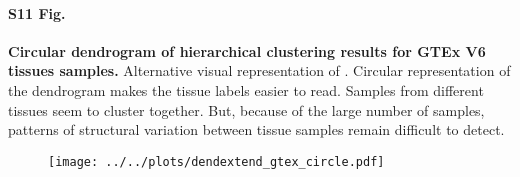 \documentclass[10pt,letterpaper]{article}
\begin{document}
\paragraph*{S11 Fig.}

\label{figS11}
{\bf Circular dendrogram of hierarchical clustering results for GTEx V6 tissues samples.} Alternative visual representation of . Circular representation of the dendrogram makes the tissue labels easier to read. Samples from different tissues seem to cluster together. But, because of the large number of samples, patterns of structural variation between tissue samples remain difficult to detect.
\begin{figure}[ht]
\centering
\texttt{[image: ../../plots/dendextend\_gtex\_circle.pdf]}
\end{figure}
\end{document}
